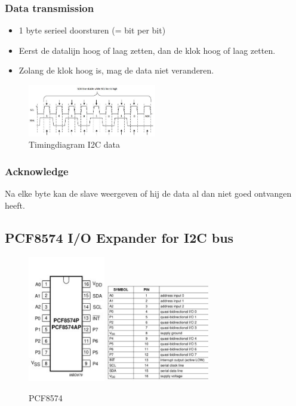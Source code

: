 \documentclass{article}
\begin{document}
\subsubsection{Data transmission}
\begin{itemize}
    \item 1 byte serieel doorsturen (= bit per bit)
    \item Eerst de datalijn hoog of laag zetten, dan de klok hoog of laag zetten. 
    \item Zolang de klok hoog is, mag de data niet veranderen.
\end{itemize}

\begin{figure}[H]
    \centering
    \includegraphics[width=0.5\textwidth]{i2c-timing.png}
    \caption{Timingdiagram I2C data}
\end{figure}

\subsubsection{Acknowledge}
Na elke byte kan de slave weergeven of hij de data al dan niet goed ontvangen heeft.

\subsection{PCF8574 I/O Expander for I2C bus}

\begin{figure}[H]
    \centering
    \includegraphics[width=0.3\textwidth]{pcf.png}
    \includegraphics[width=0.4\textwidth]{pcf-pins.png}
    \caption{PCF8574}
\end{figure}
\end{document}
